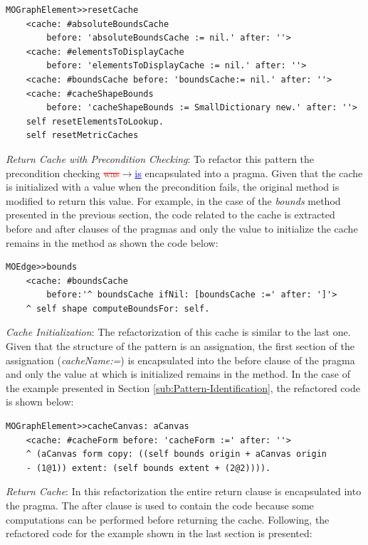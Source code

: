 \documentclass[runningheads]{llncs}
\newcommand{\ra}{$\rightarrow$}
\newcommand{\ugh}[1]{\textcolor{red}{\uwave{#1}}} %
\newcommand{\chg}[2]{\textcolor{red}{\sout{#1}}{\ra}\textcolor{blue}{\uline{#2}}} %
\begin{document}
\begin{lstlisting} 
MOGraphElement>>resetCache 
	<cache: #absoluteBoundsCache 
		before: 'absoluteBoundsCache := nil.' after: ''> 
	<cache: #elementsToDisplayCache 
		before: 'elementsToDisplayCache := nil.' after: ''> 
	<cache: #boundsCache before: 'boundsCache:= nil.' after: ''> 
	<cache: #cacheShapeBounds 
		before: 'cacheShapeBounds := SmallDictionary new.' after: ''> 
	self resetElementsToLookup. 
	self resetMetricCaches 
\end{lstlisting}

\emph{Return Cache with Precondition Checking}: To refactor this pattern
the precondition checking \chg{was}{is} encapsulated into a pragma. Given that
the cache is initialized with a value when the precondition fails,
the original method is modified to return this value. For example,
in the case of the \emph{bounds} method presented in the previous
section, the code related to the cache is extracted \ugh{to the} before
and after clauses of the pragmas and only the value to initialize
the cache remains in the method as shown the code below:

\begin{lstlisting} 
MOEdge>>bounds 
	<cache: #boundsCache 
		before:'^ boundsCache ifNil: [boundsCache :=' after: ']'> 
	^ self shape computeBoundsFor: self. 
\end{lstlisting}

\emph{Cache Initialization}: The refactorization of this cache is
similar to the last one. Given that the structure of the pattern is
an assignation, the first section of the assignation (\emph{cacheName:=})
is encapsulated into the before clause of the pragma and only the
value at which is initialized remains in the method. In the case of
the example presented in Section \ref{sub:Pattern-Identification},
the refactored code is shown below:

\begin{lstlisting} 
MOGraphElement>>cacheCanvas: aCanvas 
	<cache: #cacheForm before: 'cacheForm :=' after: ''> 
	^ (aCanvas form copy: ((self bounds origin + aCanvas origin 
	- (1@1)) extent: (self bounds extent + (2@2)))). 
\end{lstlisting}

\emph{Return Cache}: In this refactorization the entire return clause
is encapsulated into the pragma. The after clause is used to contain
the code because some computations can be performed before returning
the cache. Following, the refactored code for the example shown in
the last section is presented:
\end{document}
